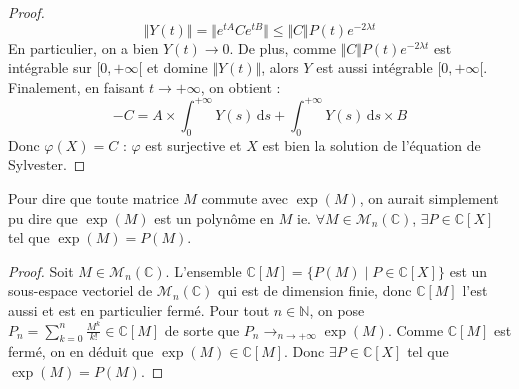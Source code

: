 \begin{proof}
    \[ \Vert Y(t) \Vert = \Vert e^{tA} C e^{tB} \Vert \leq \Vert C \Vert P(t) e^{-2 \lambda t} \]
    En particulier, on a bien $Y(t) \longrightarrow 0$. De plus, comme $\Vert C \Vert P(t) e^{-2 \lambda t}$ est intégrable sur $[0, +\infty[$ et domine $\Vert Y(t) \Vert$, alors $Y$ est aussi intégrable $[0, +\infty[$. Finalement, en faisant $t \longrightarrow +\infty$, on obtient :
    \[ -C = A \times \int_{0}^{+\infty} Y(s) \, \mathrm{d}s + \int_{0}^{+\infty} Y(s) \, \mathrm{d}s \times B \]
    Donc $\varphi(X) = C$ : $\varphi$ est surjective et $X$ est bien la solution de l'équation de Sylvester.
  \end{proof}


  \begin{remark}
    Pour dire que toute matrice $M$ commute avec $\exp(M)$, on aurait simplement pu dire que $\exp(M)$ est un polynôme en $M$ ie. $\forall M \in \mathcal{M}_n(\mathbb{C})$, $\exists P \in \mathbb{C}[X]$ tel que $\exp(M) = P(M)$.
  \end{remark}

  \begin{proof}
    Soit $M \in \mathcal{M}_n(\mathbb{C})$. L'ensemble $\mathbb{C}[M] = \{ P(M) \mid P \in \mathbb{C}[X] \}$ est un sous-espace vectoriel de $\mathcal{M}_n(\mathbb{C})$ qui est de dimension finie, donc $\mathbb{C}[M]$ l'est aussi et est en particulier fermé.
    \newpar
    Pour tout $n \in \mathbb{N}$, on pose $P_n = \sum_{k=0}^n \frac{M^k}{k!} \in \mathbb{C}[M]$ de sorte que $P_n \longrightarrow_{n \rightarrow +\infty} \exp(M)$. Comme $\mathbb{C}[M]$ est fermé, on en déduit que $\exp(M) \in \mathbb{C}[M]$. Donc $\exists P \in \mathbb{C}[X]$ tel que $\exp(M) = P(M)$.
  \end{proof}

